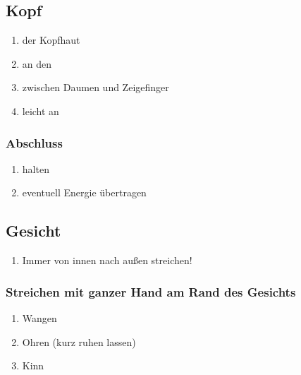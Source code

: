 \subsection{Kopf}

\begin{enumerate}
	\item {} der Kopfhaut
	\item an den 
	\item {} zwischen Daumen und Zeigefinger 
	\item leicht an 
\end{enumerate}

\subsubsection{Abschluss}
\begin{enumerate}
	\item {} halten
	\item eventuell Energie übertragen
\end{enumerate}


\subsection{Gesicht}
\begin{enumerate}
\item Immer von innen nach außen streichen!
\end{enumerate}

\subsubsection{Streichen mit ganzer Hand am Rand des Gesichts}
\begin{enumerate}
\item Wangen
\item Ohren (kurz ruhen lassen)
\item Kinn
\end{enumerate}

